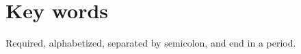 \section*{Key words}
\normalsize Required, alphabetized, separated by semicolon, and end in a period.\\
\pagebreak
\begin{center}
	\tableofcontents
	\listoftables
	\listoffigures
\end{center}
\pagebreak
{}
